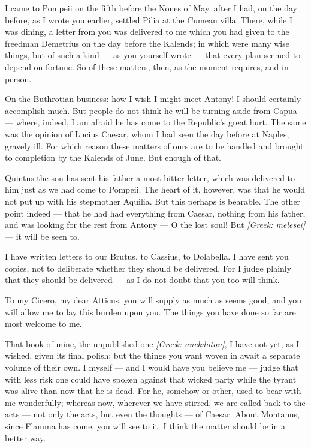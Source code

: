 

 I came to Pompeii on the fifth before the Nones of May, after I had, on the day before, as I wrote you earlier, settled Pilia at the Cumean villa. There, while I was dining, a letter from you was delivered to me which you had given to the freedman Demetrius on the day before the Kalends; in which were many wise things, but of such a kind --- as you yourself wrote --- that every plan seemed to depend on fortune. So of these matters, then, as the moment requires, and in person.

 On the Buthrotian business: how I wish I might meet Antony! I should certainly accomplish much. But people do not think he will be turning aside from Capua --- where, indeed, I am afraid he has come to the Republic's great hurt. The same was the opinion of Lucius Caesar, whom I had seen the day before at Naples, gravely ill. For which reason these matters of ours are to be handled and brought to completion by the Kalends of June. But enough of that.

 Quintus the son has sent his father a most bitter letter, which was delivered to him just as we had come to Pompeii. The heart of it, however, was that he would not put up with his stepmother Aquilia. But this perhaps is bearable. The other point indeed --- that he had had everything from Caesar, nothing from his father, and was looking for the rest from Antony --- O the lost soul! But \textit{[Greek: mel\=esei]} --- it will be seen to.

 I have written letters to our Brutus, to Cassius, to Dolabella. I have sent you copies, not to deliberate whether they should be delivered. For I judge plainly that they should be delivered --- as I do not doubt that you too will think.

 To my Cicero, my dear Atticus, you will supply as much as seems good, and you will allow me to lay this burden upon you. The things you have done so far are most welcome to me.

 That book of mine, the unpublished one \textit{[Greek: anekdoton]}, I have not yet, as I wished, given its final polish; but the things you want woven in await a separate volume of their own. I myself --- and I would have you believe me --- judge that with less risk one could have spoken against that wicked party while the tyrant was alive than now that he is dead. For he, somehow or other, used to bear with me wonderfully; whereas now, wherever we have stirred, we are called back to the acts --- not only the acts, but even the thoughts --- of Caesar. About Montanus, since Flamma has come, you will see to it. I think the matter should be in a better way.
